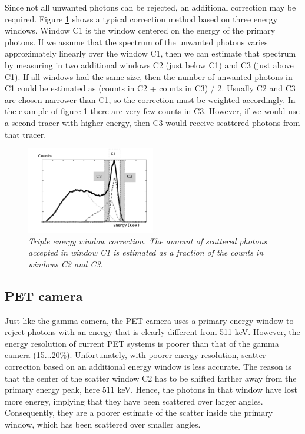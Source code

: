 \documentclass[11pt,oneside]{book}
\begin{document}
Since not all unwanted photons can be rejected, an additional correction may
be required. Figure \ref{fig:TEW_scatter} shows a typical correction method
based on three energy windows. Window C1 is the window centered on the energy
of the primary photons. If we assume that the spectrum of the unwanted photons
varies approximately linearly over the window C1, then we can estimate that
spectrum by measuring in two additional windows C2 (just below C1) and C3
(just above C1). If all windows had the same size, then the number of unwanted
photons in C1 could be estimated as (counts in C2 + counts in C3) / 2. Usually
C2 and C3 are chosen narrower than C1, so the correction must be weighted
accordingly. In the example of figure \ref{fig:TEW_scatter} there are very few
counts in C3. However, if we would use a second tracer with higher energy,
then C3 would receive scattered photons from that tracer.

\begin{figure}[tb]
\centering
\includegraphics[width=0.5\textwidth]{figs/fig_TEW_scatter.pdf}
\caption{\label{fig:TEW_scatter} \emph{Triple energy window correction. The
amount of scattered photons accepted in window C1 is estimated as a fraction
of the counts in windows C2 and C3.}}
\end{figure}

\subsection{PET camera} \label{sec:petscatcor}
Just like the gamma camera, the PET camera uses a primary energy
window to reject photons with an energy that is clearly different from
511 keV. However, the energy resolution of current PET systems is
poorer than that of the gamma camera (15$\ldots$20\%). Unfortunately,
with poorer energy resolution, scatter correction based on an
additional energy window is less accurate. The reason is that the
center of the scatter window C2 has to be shifted farther away from
the primary energy peak, here 511 keV. Hence, the photons in that
window have lost more energy, implying that they have been scattered
over larger angles. Consequently, they are a poorer estimate of the
scatter inside the primary window, which has been scattered over
smaller angles.
\end{document}
